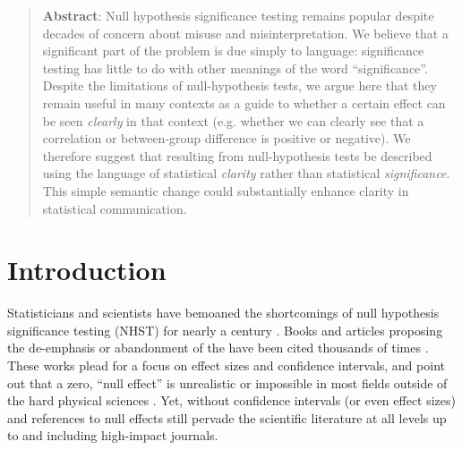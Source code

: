 \begin{abstract}

\textbf{Abstract}: Null hypothesis significance testing remains popular despite decades of concern about misuse and misinterpretation. We believe that a significant part of the problem is due simply to language: significance testing has little to do with other meanings of the word ``significance''. Despite the limitations of null-hypothesis tests, we argue here that they remain useful in many contexts as a guide to whether a certain effect can be seen \emph{clearly} in that context (e.g. whether we can clearly see that a correlation or between-group difference is positive or negative). We therefore suggest that \pvals resulting from null-hypothesis tests be described using the language of statistical \emph{clarity} rather than statistical \emph{significance}. This simple semantic change could substantially enhance clarity in statistical communication.

\end{abstract}

\flushbottom
\maketitle
\newpage
\thispagestyle{empty}

\clearpage

\section*{Introduction}

Statisticians and scientists have bemoaned the shortcomings of null hypothesis significance testing (NHST) for nearly a century \citep{Cohen1994}.
Books and articles proposing the de-emphasis or abandonment of the \pval have been cited thousands of times \citep{Cohen1994, Goodman1999, Wilkinson1999, ZiliakandMcCloskey2008, WassersteinandLazar2016}. These works plead for a focus on effect sizes and confidence intervals, and point out that a zero, ``null effect'' is unrealistic or impossible in most fields outside of the hard physical sciences \citep{Meehl1990, Tukey1991, Cohen1994}. Yet, \pvals without confidence intervals (or even effect sizes) and references to null effects still pervade the scientific literature at all levels up to and including high-impact journals.

